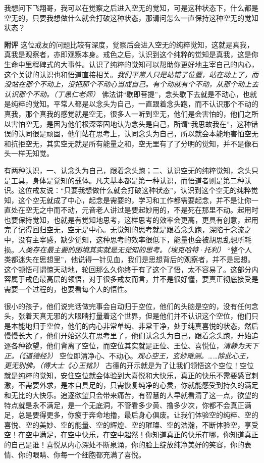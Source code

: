 \begin{case}
    我想问下飞翔哥，我可以在觉察之后进入空无的觉知，可是这种状态下，什么都是空无的，只要我想做什么就会打破这种状态，那请问怎么一直保持这种空无的觉知状态？

    \textbf{附评} 这位戒友的问题比较有深度，觉察后会进入空无的纯粹觉知，这就是真我，真我是观察者，亦即观察本身。戒色之后，认识到这个纯粹的觉知是真我，这是你生命中里程碑式的大事件。认识了纯粹的觉知可以帮助你更好地主宰自己的内心，这个关键的认识也和悟道直接相关。\textit{我们平常人只是站错了位置，站在动上了，而没站在那个不动上，没把那个不动心当成自己。有个动就有个不动，从那个动上去认识那个不动。（丁愚仁老师）} 佛法讲“歇即菩提”，念头歇下去就是不动心，也就是纯粹的觉知。平常人都是以念头为自己，一直跟着念头跑，而不认识那个不动的真我，那个真我的感觉就是空无，很多人一听到空无，他们是会害怕的，他们之所以害怕空无，是因为他们根深蒂固地认为念头是自己，所谓“我思故我在”，这种错误的认同很是顽固，他们站在思考上，认同念头为自己，所以就会本能地害怕空无和抗拒空无，其实空无就是所有能量之和，空无里有了了分明的觉知，并不是像石头一样无知觉。

    有两种认识，一、认念头为自己，跟着念头跑；二、认识空无的纯粹觉知，念头只是工具，身体是觉知的载体。凡夫基本都是第一种认识，而悟道者则是第二种认识。这位戒友说：“只要我想做什么就会打破这种状态”，认识到这个空无的纯粹觉知，这个空无就成了中心，起念是需要的，学习和工作都需要起念，并不是让你一直处在空无之中而不动，元音老人讲过是要起妙用的，不是死在那里不动。起用时也要保持觉知，也就是有觉知地思考，这样思考的效率会更高，更具有创意，起用完了记得回归空无，空无是中心。无觉知的思考就是跟着念头跑，深陷于念流之中，没有主宰感，缺少觉知，这种思考的效率很低下，能量也会被胡思乱想所耗损。\textit{人类存在最主要的困境其实就是无觉知的思考。（埃克哈特·托利）} “整个人类都迷失在思想里”，他说得一针见血，我们是思想背后的观察者，并不是思想。这个顿悟可谓惊天动地，轮回那么久你终于有了这个了悟，太不容易了。这部分内容属于戒色最高层的领悟，对于很多戒友而言，并不是很好懂，要真正彻底接受是需要一个过程的，也要看每个人的悟性。

    很小的孩子，他们说完话做完事会自动归于空位，他们的头脑是空的，没有任何念头，张着天真无邪的大眼睛打量着这个世界，但是他们并不认识这个空位，他们只是本能地归于空位，他们的内心非常单纯、非常干净，处于纯真喜悦的状态，然后慢慢长大了，他们开始迷失在思考里了，他们认念头为自己，跟着念头跑，开始追逐各种欲望，他们背离了空位，而空位其实就是正位、王位、喜悦位，\textit{清静为天下正。（《道德经》）} 空位即清净心、不动心。\textit{观心空王，玄妙难测。……除此心王，更无别佛。（傅大士《心王铭》）} 古德的开示就是为了让我们领悟这个空位！空位就是纯粹的觉知，安住空位就会体验到大喜悦和大快乐，真正的快乐不需要感官刺激，不需要外求，是本自具足的，只需恢复纯净的心灵，你就能感受到持久的满足和无比的大快乐。追逐欲望只会带来痛苦，有智慧的人早就看清了这一点，欲望的特点就是永不满足，是一个无底洞，不管看多少黄、撸多少次，你都不会真正满足，总是要得更多，你疲于奔命地撸，最后身心俱废。让我们体验空的纯粹、空的喜悦、空的美妙、空的能量、空的辉煌、空的璀璨、空的浩瀚，不断体验空，享受空！在空中满足，在空中快乐，在空中超然！你知道真正的快乐在哪，你知道真正的自己是谁！喜悦从内心深处不断泉涌，你的脸上绽放纯净美好的笑容，你的表情、你的眼睛、你每一个细胞都充满了喜悦。
\end{case}

